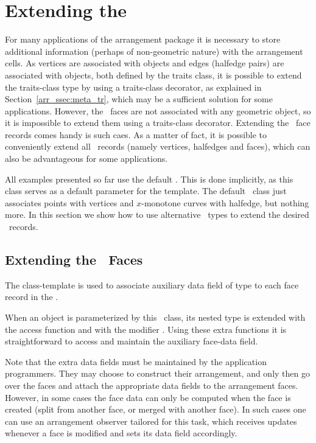 \section{Extending the \dcel}
\label{arr_sec:ex_dcel}
%
For many applications of the arrangement package it is necessary to
store additional information (perhaps of non-geometric nature) with
the arrangement cells. As vertices are associated with 
objects and edges (halfedge pairs) are associated with
 objects, both defined by the traits class,
it is possible to extend the traits-class type by using a traits-class
decorator, as explained in Section~\ref{arr_ssec:meta_tr}, which may
be a sufficient solution for some applications.
However, the \dcel\ faces are not associated with any geometric object, 
so it is impossible to extend them using a traits-class decorator. 
Extending the \dcel\ face records comes handy is such caes. As a matter
of fact, it is possible to conveniently extend all \dcel\ records
(namely vertices, halfedges and faces), which can also be advantageous
for some applications.

All examples presented so far use the default . 
This is done implicitly, as this class serves as a default parameter for 
the  template. The default \dcel\ class just associates 
points with vertices and $x$-monotone curves with halfedge, but nothing more. 
In this section we show how to use alternative \dcel\ types to extend the 
desired \dcel\ records.

\subsection{Extending the \dcel\ Faces}
\label{arr_ssec:ex_dcel_face}
%
The  class-template
is used to associate auxiliary data field of type  to
each face record in the \dcel.

When an  object is parameterized by this 
\dcel\ class, its nested  type is extended with the access function
 and with the modifier . Using these extra
functions it is straightforward to access and maintain the auxiliary
face-data field.

Note that the extra data fields must be maintained by the application
programmers. They may choose to construct their arrangement, and
only then go over the faces and attach the appropriate data fields to
the arrangement faces. However, in some cases the face data can only
be computed when the face is created (split from another face, or merged
with another face). In such cases one can use an arrangement observer
tailored for this task, which receives updates whenever a face is
modified and sets its data field accordingly.

